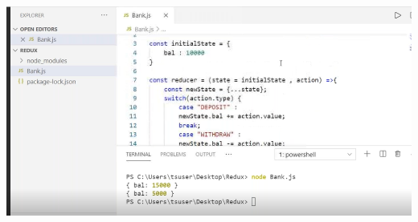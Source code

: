 \documentclass{article}
\begin{document}
\noindent 

\noindent 

\begin{center}
	\noindent \includegraphics*[width=6.19in, height=3.20in]{IMG-11-04}
\end{center}
\end{document}
